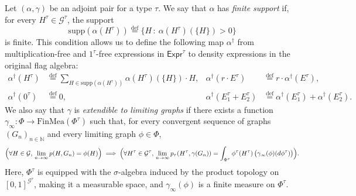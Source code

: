 \documentclass{article}
\newcommand*{\defeq}{\stackrel{\mathrm{def}}{=}}
\newcommand*{\Expr}{\mathsf{Expr}}
\newcommand*{\FinMea}{\mathrm{FinMea}}
\newcommand*{\support}{\mathrm{supp}}
\begin{document}
Let $(\alpha,\gamma)$ be an adjoint pair for a type $\tau$.
We say that $\alpha$ has \emph{finite support} if, for every $H^\tau \in \mathcal{G}^\tau$, the support
\[
\support(\alpha(H^\tau)) \defeq \{ H \,:\ \alpha(H^\tau)(\{H\}) > 0 \}
\]
is finite. This condition allows us to define the following map $\alpha^\dagger$ from multiplication-free and $1^\tau$-free expressions in $\Expr^\tau$ to density expressions in the original flag algebra:
\begin{align*}
  \alpha^\dagger(H^\tau) & \defeq \sum_{H \in \support(\alpha(H^\tau))} \alpha(H^\tau)(\{H\}) \cdot H,
  &
  \alpha^\dagger(r \cdot E^\tau) & \defeq r \cdot \alpha^\dagger(E^\tau),
  \\
  \alpha^\dagger(0^\tau) & \defeq 0,
  &
  \alpha^\dagger(E_1^\tau + E_2^\tau) & \defeq \alpha^\dagger(E_1^\tau) + \alpha^\dagger(E_2^\tau).
\end{align*}
We also say that $\gamma$ is \emph{extendible to limiting graphs} if there exists a function $\gamma_\infty : \Phi \to \FinMea(\Phi^\tau)$ such that, for every convergent sequence of graphs $(G_n)_{n \in \mathbb{N}}$ and every limiting graph $\phi \in \Phi$,
\[
\Bigl(\forall H \in \mathcal{G},\, \lim_{n \to \infty} p(H, G_n) = \phi(H)\Bigr)
\implies
\Bigl(\forall H^\tau \in \mathcal{G}^\tau,\, \lim_{n \to \infty} p_\tau(H^\tau, \gamma(G_n)) = \int_{\Phi^\tau} \phi^\tau(H^\tau) \,\bigl(\gamma_\infty(\phi)(d\phi^\tau)\bigr)\Bigr).
\]
Here, $\Phi^\tau$ is equipped with the $\sigma$-algebra induced by the product topology on $[0,1]^{\mathcal{G}^\tau}$, making it a measurable space, and $\gamma_\infty(\phi)$ is a finite measure on $\Phi^\tau$.
\end{document}
